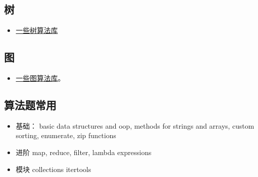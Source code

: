 \subsection{树}
\begin{itemize}
\item \href{https://stackoverflow.com/questions/2442014/tree-libraries-in-python}{一些树算法库}
\end{itemize}


\subsection{图}
\begin{itemize}
\item \href{https://wiki.python.org/moin/PythonGraphLibraries}{一些图算法库}。
\end{itemize}

\subsection{算法题常用}
\begin{itemize}
\item 基础： basic data structures and oop, methods for strings and arrays, custom sorting, enumerate, zip functions
\item 进阶 map, reduce, filter, lambda expressions
\item 模块 collections itertools
\end{itemize}
